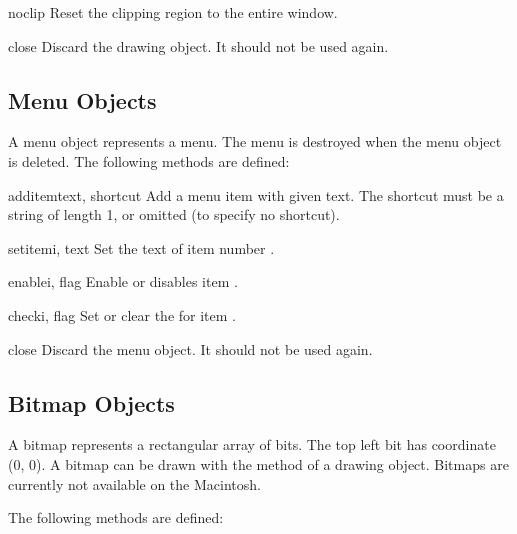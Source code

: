 \begin{methoddesc}[drawing]{noclip}{}
Reset the clipping region to the entire window.
\end{methoddesc}

\begin{methoddesc}[drawing]{close}{}
Discard the drawing object.  It should not be used again.
\end{methoddesc}

\subsection{Menu Objects}

A menu object represents a menu.
The menu is destroyed when the menu object is deleted.
The following methods are defined:


\begin{methoddesc}[menu]{additem}{text, shortcut}
Add a menu item with given text.
The shortcut must be a string of length 1, or omitted (to specify no
shortcut).
\end{methoddesc}

\begin{methoddesc}[menu]{setitem}{i, text}
Set the text of item number .
\end{methoddesc}

\begin{methoddesc}[menu]{enable}{i, flag}
Enable or disables item .
\end{methoddesc}

\begin{methoddesc}[menu]{check}{i, flag}
Set or clear the  for item .
\end{methoddesc}

\begin{methoddesc}[menu]{close}{}
Discard the menu object.  It should not be used again.
\end{methoddesc}

\subsection{Bitmap Objects}

A bitmap represents a rectangular array of bits.
The top left bit has coordinate (0, 0).
A bitmap can be drawn with the  method of a drawing object.
Bitmaps are currently not available on the Macintosh.

The following methods are defined:


